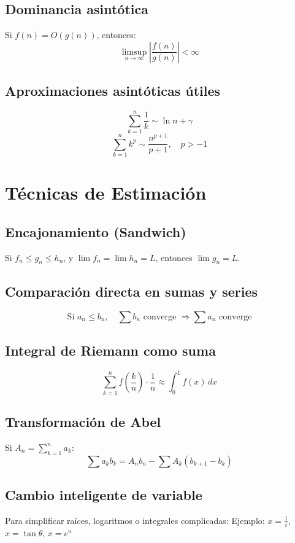 \documentclass[12pt]{article}
\begin{document}
\subsection{Dominancia asintótica}
Si \(f(n) = O(g(n))\), entonces:
\[
\limsup_{n \to \infty} \left| \frac{f(n)}{g(n)} \right| < \infty
\]

\subsection{Aproximaciones asintóticas útiles}
\[
\sum_{k=1}^n \frac{1}{k} \sim \ln n + \gamma
\]
\[
\sum_{k=1}^n k^p \sim \frac{n^{p+1}}{p+1},\quad p > -1
\]

\section{Técnicas de Estimación}

\subsection{Encajonamiento (Sandwich)}
Si \(f_n \leq g_n \leq h_n\), y \(\lim f_n = \lim h_n = L\), entonces \(\lim g_n = L\).

\subsection{Comparación directa en sumas y series}
\[
\text{Si } a_n \leq b_n,\quad \sum b_n \text{ converge } \Rightarrow \sum a_n \text{ converge}
\]

\subsection{Integral de Riemann como suma}
\[
\sum_{k=1}^n f\left(\frac{k}{n}\right) \cdot \frac{1}{n} \approx \int_0^1 f(x)\,dx
\]

\subsection{Transformación de Abel}
Si \(A_n = \sum_{k=1}^n a_k\):
\[
\sum a_k b_k = A_n b_n - \sum A_k (b_{k+1} - b_k)
\]

\subsection{Cambio inteligente de variable}
Para simplificar raíces, logaritmos o integrales complicadas:  
Ejemplo: \(x = \frac{1}{t}\), \(x = \tan \theta\), \(x = e^u\)
\end{document}
